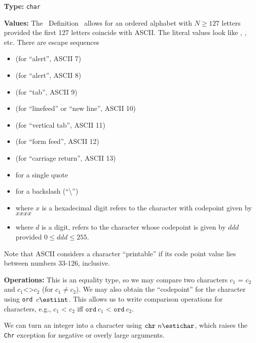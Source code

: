 \begin{node}[Characters]\label{sml-000O}%
\textbf{Type:} \texttt{char}

\textbf{Values:} The \SML\ Definition~\cite[\S2.2]{milner1997definition}
allows for an ordered alphabet with $N\geq 127$ letters provided the
first 127 letters coincide with ASCII. The literal values look like
, , etc. There are escape sequences
\begin{itemize}
\item {} (for ``alert'', ASCII 7)
\item {} (for ``alert'', ASCII 8)
\item {} (for ``tab'', ASCII 9)
\item {} (for ``linefeed'' or ``new line'', ASCII 10)
\item {} (for ``vertical tab'', ASCII 11)
\item {} (for ``form feed'', ASCII 12)
\item {} (for ``carriage return'', ASCII 13)
\item {} for a single quote
\item \Char{\texttt{\textbackslash\textbackslash}} for a backslash (``\textbackslash'')
\item {} where $x$ is a hexadecimal
  digit refers to the character with codepoint given by $xxxx$
\item {} where $d$ is a digit, refers to the
  character whose codepoint is given by $ddd$ provided $0\leq ddd\leq255$.
\end{itemize}
Note that ASCII considers a character ``printable'' if its code point
value lies between numbers 33-126, inclusive.

\textbf{Operations:} This is an equality type, so we may compare two
characters $c_{1}\texttt{ = }c_{2}$ and $c_{1}\texttt{<>} c_{2}$ (for
$c_{1}\neq c_{2}$). We may also obtain the ``codepoint'' for the
character using \texttt{ord}~$c\esti\texttt{int}$. This allows us to
write comparison operations for characters, e.g., $c_{1}\texttt{ < }c_{2}$
iff $\texttt{ord}~c_{1}\texttt{ < }\texttt{ord}~c_{2}$.

We can turn an integer into a character using $\texttt{chr}~n\esti\texttt{char}$,
which raises the \texttt{Chr} exception for negative or overly large arguments.



\end{node}
